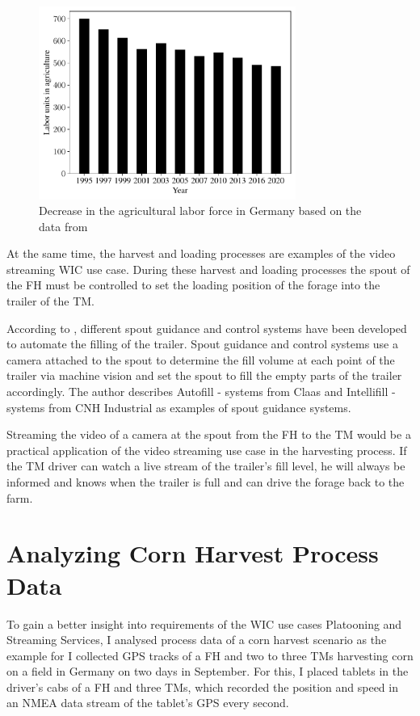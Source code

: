 \documentclass[]{nsm-thesis}
\begin{document}
\begin{figure}%
	\centering
	\includegraphics[width=0.75\textwidth]{figures/WorkForceAgriculture.pdf}
	\caption{Decrease in the agricultural labor force in Germany based on the data from \cite{bmel2020}}%
	\label{fig:workforce_agri}%
\end{figure}


At the same time, the harvest and loading processes are examples of the video streaming \ac{WIC} use case. During these harvest and loading processes the spout of the \ac{FH} must be controlled to set the loading position of the forage into the trailer of the \ac{TM}.

According to \textcite{murcia_quadrotor_2014}, different spout guidance and control systems have been developed to automate the filling of the trailer. Spout guidance and control systems use a camera attached to the spout to determine the fill volume at each point of the trailer via machine vision and set the spout to fill the empty parts of the trailer accordingly. The author describes Autofill - systems from Claas and Intellifill - systems from CNH Industrial as examples of spout guidance systems. 

Streaming the video of a camera at the spout from the \ac{FH} to the \ac{TM} would be a practical application of the video streaming use case in the harvesting process. If the \ac{TM} driver can watch a live stream of the trailer's fill level, he will always be
informed and knows when the trailer is full and can drive the forage back to the
farm.

\chapter{Analyzing Corn Harvest Process Data}

To gain a better insight into requirements of the \ac{WIC} use cases Platooning and Streaming Services, I analysed process data of a corn harvest scenario as the example for I collected GPS tracks of  a  \ac{FH} and two to three \ac{TM}s harvesting corn on a field in Germany on two days in September. For this, I placed tablets in the driver's cabs of  a  \ac{FH} and three \ac{TM}s, which recorded the position and speed in an NMEA data stream of the tablet's GPS every second. 
\end{document}

